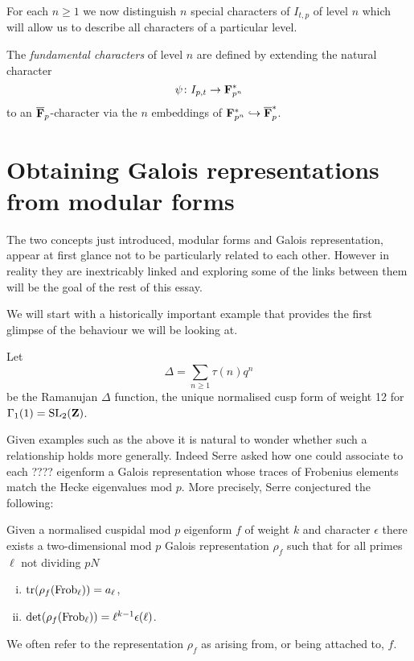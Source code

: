 \documentclass[a4paper,12pt]{article}
\begin{document}
For each $n \ge 1$ we now distinguish $n$ special characters of $I_{t,p}$ of level $n$ which will allow us to describe all characters of a particular level.

\begin{defn}\label{def-fund}
The \emph{fundamental characters} of level $n$ are defined by extending the natural character
\[
\psi\colon I_{p,t} \to \mathbf{F}_{p^n}^*
\]
to an $\overline{\mathbf{F}}_p$-character via the $n$ embeddings of $\mathbf{F}_{p^n}^* \hookrightarrow \overline{\mathbf{F}}_p^*$. %
\end{defn}




\section{Obtaining Galois representations from modular forms}
The two concepts just introduced, modular forms and Galois representation, appear at first glance not to be particularly related to each other.
However in reality they are inextricably linked and exploring some of the links between them will be the goal of the rest of this essay.

We will start with a historically important example that provides the first glimpse of the behaviour we will be looking at.

\begin{ex}\label{ex-delt}
Let
\[
\Delta = \sum_{n \ge 1} \tau(n) q^n
\]
be the Ramanujan $\Delta$ function, the unique normalised cusp form of weight 12 for $\Gamma_1(1) = \operatorname{SL}_2(\mathbf{Z})$.
\end{ex}

Given examples such as the above it is natural to wonder whether such a relationship holds more generally.
Indeed Serre asked how one could associate to each ???? eigenform a Galois representation whose traces of Frobenius elements match the Hecke eigenvalues mod $p$.
More precisely, Serre conjectured the following: %

\begin{thm}\label{thm-assoc}
Given a normalised cuspidal mod $p$ eigenform $f$ of weight $k$ and character $\epsilon$ there exists a two-dimensional mod $p$ Galois representation $\rho_f$ such that for all primes $\ell$ not dividing $pN$ %
\begin{enumerate}[(i)]
\item $\operatorname{tr}(\rho_f (\operatorname{Frob}_\ell)) = a_\ell$,
\item $\det(\rho_f (\operatorname{Frob}_\ell)) = \ell^{k-1}\epsilon(\ell)$. %
\end{enumerate}
We often refer to the representation $\rho_f$ as arising from, or being attached to, $f$.
\end{thm}
\end{document}
